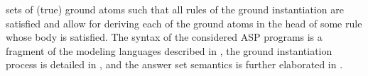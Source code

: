 \documentclass{tlp} %
\begin{document}
sets of (true) ground atoms such that all rules of the ground instantiation
are satisfied and allow for deriving each of the ground atoms in the head of
some rule whose body is satisfied.
The syntax of the considered ASP programs is a fragment of the modeling languages
described in \citep{cafageiakakrlemarisc20a,gehakalisc15a},
the ground instantiation process is detailed in \citep{kamsch21a},
and the answer set semantics is further elaborated in \citep{gehakalisc15a,lifschitz19a}.
%
\end{document}
